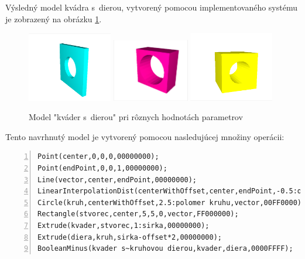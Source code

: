 Výsledný model kvádra s~dierou, vytvorený pomocou implementovaného systému je zobrazený na obrázku \ref{fig:qwerty7io}.

\begin{figure}[H]
	\centering
	\includegraphics[trim=10 10 10 10,clip,width=0.33\textwidth]{obrazky-figures/Examples/kvader s dierou1.png}
	\includegraphics[trim=10 10 10 10,clip,width=0.30\textwidth]{obrazky-figures/Examples/kvader s dierou2.png}
	\includegraphics[trim=10 10 10 10,clip,width=0.33\textwidth]{obrazky-figures/Examples/kvader s dierou3.png}
	\caption{Model "kváder s~dierou" pri rôznych hodnotách parametrov}
	\label{fig:qwerty7io}
\end{figure}

Tento navrhnutý model je vytvorený pomocou nasledujúcej množiny operácii:\nopagebreak

\vspace{10px}
\begin{minipage}{\linewidth}
\begin{lstlisting}[frame = {tb},numbers={left}]
Point(center,0,0,0,00000000);
Point(endPoint,0,0,1,00000000);
Line(vector,center,endPoint,00000000);
LinearInterpolationDist(centerWithOffset,center,endPoint,-0.5:offset,00000000);
Circle(kruh,centerWithOffset,2.5:polomer kruhu,vector,00FF0000);
Rectangle(stvorec,center,5,5,0,vector,FF000000);
Extrude(kvader,stvorec,1:sirka,00000000);
Extrude(diera,kruh,sirka-offset*2,00000000);
BooleanMinus(kvader s~kruhovou dierou,kvader,diera,0000FFFF);
\end{lstlisting}
\end{minipage}

